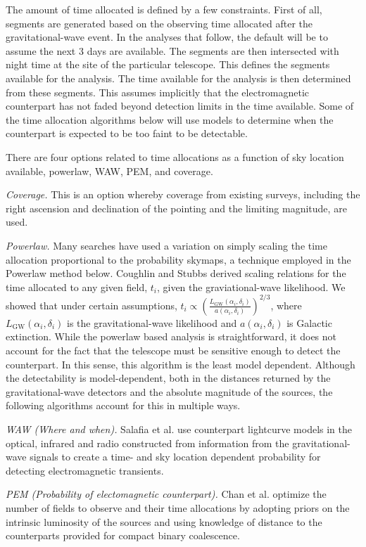 \documentclass[twocolumn]{aastex61}
\begin{document}
The amount of time allocated is defined by a few constraints. 
First of all, segments are generated based on the observing time allocated after the gravitational-wave event. In the analyses that follow, the default will be to assume the next 3 days are available.
The segments are then intersected with night time at the site of the particular telescope.
This defines the segments available for the analysis.
The time available for the analysis is then determined from these segments.
This assumes implicitly that the electromagnetic counterpart has not faded beyond detection limits in the time available. Some of the time allocation algorithms below will use models to determine when the counterpart is expected to be too faint to be detectable.

There are four options related to time allocations as a function of sky location available, powerlaw, WAW, PEM, and coverage.

\emph{Coverage.} This is an option whereby coverage from existing surveys, including the right ascension and declination of the pointing and the limiting magnitude, are used.

\emph{Powerlaw.} Many searches have used a variation on simply scaling the time allocation proportional to the probability skymaps, a technique employed in the Powerlaw method below. Coughlin and Stubbs \cite{CoSt2016a} derived scaling relations for the time allocated to any given field, $t_i$, given the graviational-wave likelihood. We showed that under certain assumptions, $t_i \propto \left(\frac{L_\textrm{GW}(\alpha_i,\delta_i)}{a(\alpha_i,\delta_i)}\right)^{2/3}$, where $L_\textrm{GW}(\alpha_i,\delta_i)$ is the gravitational-wave likelihood and $a(\alpha_i,\delta_i)$ is Galactic extinction.  While the powerlaw based analysis is straightforward, it does not account for the fact that the telescope must be sensitive enough to detect the counterpart. In this sense, this algorithm is the least model dependent. Although the detectability is model-dependent, both in the distances returned by the gravitational-wave detectors and the absolute magnitude of the sources, the following algorithms account for this in multiple ways.

\emph{WAW (Where and when).} Salafia et al. \cite{SoCo2017} use counterpart lightcurve models in the optical, infrared and radio constructed from information from the gravitational-wave signals to create a time- and sky location dependent probability for detecting electromagnetic transients.

\emph{PEM (Probability of electomagnetic counterpart).} Chan et al. \cite{ChHu2017} optimize the number of fields to observe and their time allocations by adopting priors on the intrinsic luminosity of the sources and using knowledge of distance to the counterparts provided for compact binary coalescence.
\end{document}
